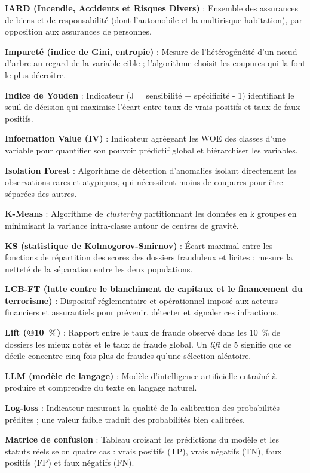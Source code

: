 \textbf{IARD (Incendie, Accidents et Risques Divers)} : Ensemble des assurances de biens et de responsabilité (dont l'automobile et la multirisque habitation), par opposition aux assurances de personnes.

\textbf{Impureté (indice de Gini, entropie)} : Mesure de l'hétérogénéité d'un nœud d'arbre au regard de la variable cible ; l'algorithme choisit les coupures qui la font le plus décroître.

\textbf{Indice de Youden} : Indicateur (J = sensibilité + spécificité - 1) identifiant le seuil de décision qui maximise l'écart entre taux de vrais positifs et taux de faux positifs.

\textbf{Information Value (IV)} : Indicateur agrégeant les WOE des classes d'une variable pour quantifier son pouvoir prédictif global et hiérarchiser les variables.

\textbf{Isolation Forest} : Algorithme de détection d'anomalies isolant directement les observations rares et atypiques, qui nécessitent moins de coupures pour être séparées des autres.

\textbf{K-Means} : Algorithme de \textit{clustering} partitionnant les données en k groupes en minimisant la variance intra-classe autour de centres de gravité.

\textbf{KS (statistique de Kolmogorov-Smirnov)} : Écart maximal entre les fonctions de répartition des scores des dossiers frauduleux et licites ; mesure la netteté de la séparation entre les deux populations.

\textbf{LCB-FT (lutte contre le blanchiment de capitaux et le financement du terrorisme)} : Dispositif réglementaire et opérationnel imposé aux acteurs financiers et assurantiels pour prévenir, détecter et signaler ces infractions.


\textbf{Lift (@10~\%)} : Rapport entre le taux de fraude observé dans les 10~\% de dossiers les mieux notés et le taux de fraude global. Un \textit{lift} de 5 signifie que ce décile concentre cinq fois plus de fraudes qu'une sélection aléatoire.

\textbf{LLM (modèle de langage)} : Modèle d'intelligence artificielle entraîné à produire et comprendre du texte en langage naturel.

\textbf{Log-loss} : Indicateur mesurant la qualité de la calibration des probabilités prédites ; une valeur faible traduit des probabilités bien calibrées.


\textbf{Matrice de confusion} : Tableau croisant les prédictions du modèle et les statuts réels selon quatre cas : vrais positifs (TP), vrais négatifs (TN), faux positifs (FP) et faux négatifs (FN).

